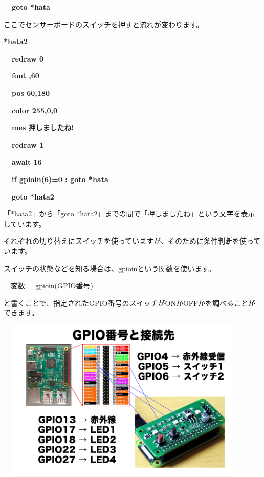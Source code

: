 \documentclass[a4paper,12pt]{jarticle}
\begin{document}
{\bfseries
\ \ goto *hata}


\bigskip

ここでセンサーボードのスイッチを押すと流れが変わります。


\bigskip

{\bfseries
*hata2}

{\bfseries
\ \ redraw 0}

{\bfseries
\ \ font {\textquotedbl}{\textquotedbl},60}

{\bfseries
\ \ pos 60,180}

{\bfseries
\ \ color 255,0,0}

{\bfseries
\ \ mes {\textquotedbl}押しましたね!{\textquotedbl}}

{\bfseries
\ \ redraw 1}

{\bfseries
\ \ await 16}

{\bfseries
\ \ if gpioin(6)=0 : goto *hata}

{\bfseries
\ \ goto *hata2}


\bigskip

「*hata2」から「goto *hata2」までの間で「押しましたね」という文字を表示しています。

それぞれの切り替えにスイッチを使っていますが、そのために条件判断を使っています。

スイッチの状態などを知る場合は、gpioinという関数を使います。


\bigskip

\ \ 変数 = gpioin(GPIO番号)

\bigskip

と書くことで、指定されたGPIO番号のスイッチがONかOFFかを調べることができます。


\bigskip
\bigskip

\begin{minipage}{9.781cm}
\centering
{\upshape
\includegraphics[keepaspectratio,width=12.409cm,height=7.62cm]{text04-img/text04-img004.png}}
\end{minipage}
\end{document}
